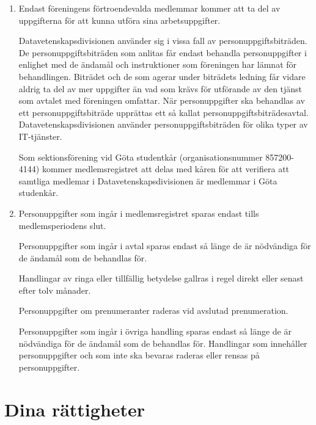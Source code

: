 \documentclass{dvd}
\begin{document}
\begin{enumerate}[label=\arabic* \S, ref=\arabic*]
        \item Endast föreningens förtroendevalda medlemmar kommer att ta del av uppgifterna för att kunna utföra sina arbetsuppgifter.

		Datavetenskapsdivisionen använder sig i vissa fall av personuppgiftsbiträden.
		De personuppgiftsbiträden som anlitas får endast behandla personuppgifter i enlighet med de ändamål och instruktioner som föreningen har lämnat för behandlingen.
		Biträdet och de som agerar under biträdets ledning får vidare aldrig ta del av mer uppgifter än vad som krävs för utförande av den tjänst som avtalet med föreningen omfattar.
		När personuppgifter ska behandlas av ett personuppgiftsbiträde upprättas ett så kallat personuppgiftsbiträdesavtal.
		Datavetenskapsdivisionen använder personuppgiftsbiträden för olika typer av IT-tjänster.

		Som sektionsförening vid Göta studentkår (organisationsnummer 857200-4144) kommer medlemsregistret att delas med kåren för att verifiera att samtliga medlemar i Datavetenskapsdivisionen är medlemmar i Göta studenkår.

        \item Personuppgifter som ingår i medlemsregistret sparas endast tills medlemsperiodens slut.

		Personuppgifter som ingår i avtal sparas endast så länge de är nödvändiga för de ändamål som de behandlas för.

		Handlingar av ringa eller tillfällig betydelse gallras i regel direkt eller senast efter tolv månader.

		Personuppgifter om prenumeranter raderas vid avslutad prenumeration.

		Personuppgifter som ingår i övriga handling sparas endast så länge de är nödvändiga för de ändamål som de behandlas för.
		Handlingar som innehåller personuppgifter och som inte ska bevaras raderas eller rensas på personuppgifter.

    \end{enumerate}

    \section{Dina rättigheter}
\end{document}
